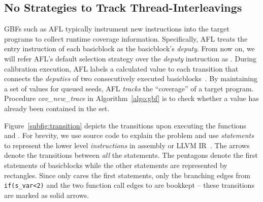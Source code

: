 \subsection{No Strategies to Track Thread-Interleavings}\label{sec:afl_issue_ins}

GBFs such as AFL typically instrument new instructions into the target programs to collect runtime 
coverage information. Specifically, AFL treats the entry instruction of each basicblock 
as the basicblock's \emph{deputy}. From now on, we will 
refer AFL's default selection strategy over the \emph{deputy} instruction as \AFLIns. 
During calibration execution, AFL labels a calculated value to each transition that 
connects the \emph{deputies} of two consecutively executed basicblocks~\cite{afl_detail}. 
By maintaining a set of values for queued seeds, AFL \emph{tracks} the ``coverage'' 
of a target program. Procedure \emph{cov\_new\_trace} in Algorithm~\ref{algo:gbf} is to check whether a value has already been contained in the set.

Figure~\ref{subfig:transition} depicts the transitions upon executing the functions  
and . For brevity, we use source code to explain the problem and use \emph{statements} to represent the lower level \emph{instructions} in assembly or LLVM IR~\cite{Lattner:2004:LCF:977395.977673}. The arrows denote the transitions between \emph{all} the statements. The pentagons denote the first statements of basicblocks while the other statements are 
represented by rectangles. Since \AFLIns only cares the first statements, only the branching 
edges from \texttt{{if}(s\_var<2)} and the two function call edges to  are bookkept
-- these transitions are marked as solid arrows.

